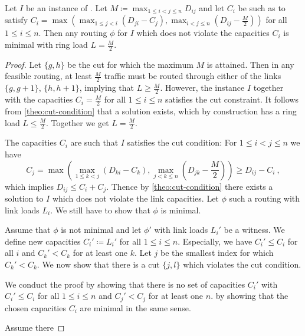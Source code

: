 \begin{lemma}
	Let $I$ be an instance of \RRL.
	Let $M \coloneqq \max_{1 \leq i < j \leq n} D_{ij}$ and let $C_i$ be such as to satisfy $C_i = \max \left(\max_{1 \leq j < i}(D_{ji} - C_j), \max_{i < j \leq n}(D_{ij} - \frac{M}{2})\right)$ for all $1 \leq i \leq n$.
	Then any routing $\phi$ for $I$ which does not violate the capacities $C_i$ is minimal with ring load $L = \frac{M}{2}$.
\end{lemma}
\begin{proof}
	Let $\{g, h\}$ be the cut for which the maximum $M$ is attained.
	Then in any feasible routing, at least $\frac{M}{2}$ traffic must be routed through either of the links $\{g, g+1\}$, $\{h, h+1\}$, implying that $L \geq \frac{M}{2}$.
	However, the instance $I$ together with the capacities $C_i = \frac{M}{2}$ for all $1 \leq i \leq n$ satisfies the cut constraint.
	It follows from \cref{theo:cut-condition} that a solution exists, which by construction has a ring load $L \leq \frac{M}{2}$.
	Together we get $L = \frac{M}{2}$.
	
	The capacities $C_i$ are such that $I$ satisfies the cut condition:
	For $1 \leq i < j \leq n$ we have
	\begin{equation}
		C_j = \max \left(\max_{1 \leq k < j}(D_{ki} - C_k), \max_{j < k \leq n}(D_{jk} - \frac{M}{2})\right) \geq D_{ij} - C_i \ ,
	\end{equation}
	which implies $D_{ij} \leq C_i + C_j$.
	Thence by \cref{theo:cut-condition} there exists a solution to $I$ which does not violate the link capacities.
	Let $\phi$ such a routing with link loads $L_i$.
	We still have to show that $\phi$ is minimal.
	
	Assume that $\phi$ is not minimal and let $\phi'$ with link loads $L_i'$ be a witness.
	We define new capacities $C_i' \coloneqq L_i'$ for all $1 \leq i \leq n$.
	Especially, we have $C_i' \leq C_i$ for all $i$ and $C_k' < C_k$ for at least one $k$.
	Let $j$ be the smallest index for which $C_k' < C_k$.
	We now show that there is a cut $\{j, l\}$ which violates the cut condition.
	
	We conduct the proof by showing that there is no set of capacities $C_i'$ with $C_i' \leq C_i$ for all $1 \leq i \leq n$ and $C_j' < C_j$ for at least one $n$. by showing that the chosen capacities $C_i$ are minimal in the same sense.
	
	Assume there 
	
	
\end{proof}

